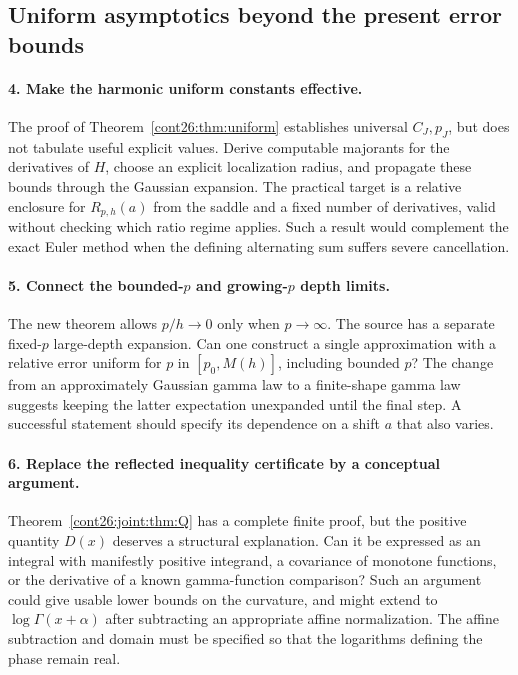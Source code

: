 \documentclass[11pt,letterpaper]{article}
\numberwithin{equation}{section}
\theoremstyle{plain}
\theoremstyle{definition}
\theoremstyle{remark}
\begin{document}
\subsection{Uniform asymptotics beyond the present error bounds}

\paragraph{4. Make the harmonic uniform constants effective.}
The proof of Theorem~\ref{cont26:thm:uniform} establishes universal
$C_J,p_J$, but does not tabulate useful explicit values. Derive
computable majorants for the derivatives of $H$, choose an explicit
localization radius, and propagate these bounds through the
Gaussian expansion. The practical target is a relative enclosure
for $R_{p,h}(a)$ from the saddle and a fixed number of derivatives,
valid without checking which ratio regime applies. Such a result
would complement the exact Euler method when the defining
alternating sum suffers severe cancellation.

\paragraph{5. Connect the bounded-$p$ and growing-$p$ depth limits.}
The new theorem allows $p/h\to0$ only when $p\to\infty$.
The source has a separate fixed-$p$ large-depth expansion.
Can one construct a single approximation with a relative error
uniform for $p$ in $[p_0,M(h)]$, including bounded $p$?
The change from an approximately Gaussian gamma law to a
finite-shape gamma law suggests keeping the latter expectation
unexpanded until the final step. A successful statement should
specify its dependence on a shift $a$ that also varies.

\paragraph{6. Replace the reflected inequality certificate by a
conceptual argument.}
Theorem~\ref{cont26:joint:thm:Q} has a complete finite proof, but the positive
quantity $D(x)$ deserves a structural explanation.
Can it be expressed as an integral with manifestly positive
integrand, a covariance of monotone functions, or the derivative
of a known gamma-function comparison? Such an argument could
give usable lower bounds on the curvature, and might extend to
$\log\Gamma(x+\alpha)$ after subtracting an appropriate affine
normalization. The affine subtraction and domain must be specified
so that the logarithms defining the phase remain real.
\end{document}
